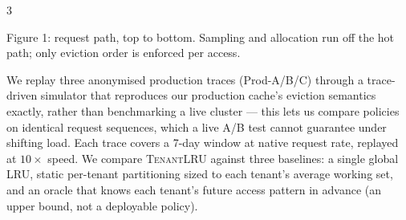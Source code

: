 \documentclass[a0,portrait,final]{sciposter}
\begin{document}
\begin{multicols}{3}
\begin{center}
\end{center}
\begin{center}\footnotesize Figure 1: request path, top to bottom. Sampling
and allocation run off the hot path; only eviction order is enforced per
access.\end{center}
\medskip

We replay three anonymised production traces (Prod-A/B/C) through a
trace-driven simulator that reproduces our production cache's eviction
semantics exactly, rather than benchmarking a live cluster — this lets us
compare policies on identical request sequences, which a live A/B test
cannot guarantee under shifting load. Each trace covers a 7-day window at
native request rate, replayed at $10\times$ speed. We compare
\textsc{TenantLRU} against three baselines: a single global LRU, static
per-tenant partitioning sized to each tenant's average working set, and an
oracle that knows each tenant's future access pattern in advance (an upper
bound, not a deployable policy).


\end{multicols}
\end{document}
